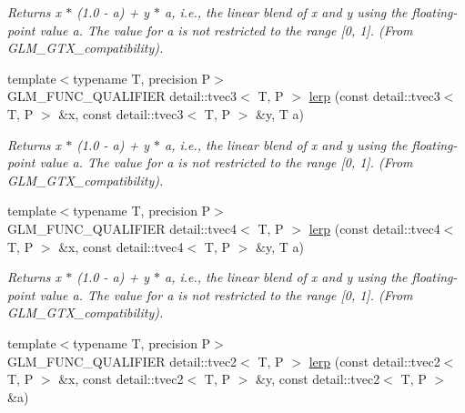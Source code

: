 \begin{CompactItemize}
\begin{CompactList}\small\item\em Returns x $\ast$ (1.0 - a) + y $\ast$ a, i.e., the linear blend of x and y using the floating-point value a. The value for a is not restricted to the range \mbox{[}0, 1\mbox{]}. (From GLM\_\-GTX\_\-compatibility). \item\end{CompactList}\item 
\hypertarget{group__gtx__compatibility_g1dd9bee5e30a2a9afc7e5892f95e5023}{
{\footnotesize template$<$typename T, precision P$>$ }\\GLM\_\-FUNC\_\-QUALIFIER detail::tvec3$<$ T, P $>$ \hyperlink{group__gtx__compatibility_g1dd9bee5e30a2a9afc7e5892f95e5023}{lerp} (const detail::tvec3$<$ T, P $>$ \&x, const detail::tvec3$<$ T, P $>$ \&y, T a)}
\label{group__gtx__compatibility_g1dd9bee5e30a2a9afc7e5892f95e5023}

\begin{CompactList}\small\item\em Returns x $\ast$ (1.0 - a) + y $\ast$ a, i.e., the linear blend of x and y using the floating-point value a. The value for a is not restricted to the range \mbox{[}0, 1\mbox{]}. (From GLM\_\-GTX\_\-compatibility). \item\end{CompactList}\item 
\hypertarget{group__gtx__compatibility_g85ea6e54085bb3e43965178e8dd371b9}{
{\footnotesize template$<$typename T, precision P$>$ }\\GLM\_\-FUNC\_\-QUALIFIER detail::tvec4$<$ T, P $>$ \hyperlink{group__gtx__compatibility_g85ea6e54085bb3e43965178e8dd371b9}{lerp} (const detail::tvec4$<$ T, P $>$ \&x, const detail::tvec4$<$ T, P $>$ \&y, T a)}
\label{group__gtx__compatibility_g85ea6e54085bb3e43965178e8dd371b9}

\begin{CompactList}\small\item\em Returns x $\ast$ (1.0 - a) + y $\ast$ a, i.e., the linear blend of x and y using the floating-point value a. The value for a is not restricted to the range \mbox{[}0, 1\mbox{]}. (From GLM\_\-GTX\_\-compatibility). \item\end{CompactList}\item 
\hypertarget{group__gtx__compatibility_g28d724046d8f648374b148b2a8ada608}{
{\footnotesize template$<$typename T, precision P$>$ }\\GLM\_\-FUNC\_\-QUALIFIER detail::tvec2$<$ T, P $>$ \hyperlink{group__gtx__compatibility_g28d724046d8f648374b148b2a8ada608}{lerp} (const detail::tvec2$<$ T, P $>$ \&x, const detail::tvec2$<$ T, P $>$ \&y, const detail::tvec2$<$ T, P $>$ \&a)}
\label{group__gtx__compatibility_g28d724046d8f648374b148b2a8ada608}


\end{CompactItemize}
